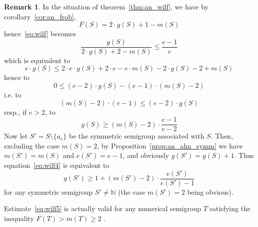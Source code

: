 \documentclass[a4paper,12pt,scrbook]{amsart}
\def \N{\mathbb N}
\theoremstyle{plain}%
\theoremstyle{definition}
\newtheorem{rem}[satz]{Remark}
\begin{document}
\begin{rem}
In the situation of theorem~\ref{thm:an_wilf}, we have 
by corollary~\ref{cor:an_frob}, 
	$$ F(S) = 2\cdot g(S)+1-m(S) $$ 
hence~\eqref{eq:wilf} becomes 
 	\begin{equation}\label{eq:wilf2} 
	\frac {g(S)}{2 \cdot g(S)+2-m(S)} \leq \frac {e-1}{e} 
	\end{equation}
which is equivalent to 
 	\begin{equation}\label{eq:wilf2.1} 
	e \cdot g(S) \leq 2 \cdot e \cdot g(S) + 2 \cdot e - e \cdot m(S) - 
	2 \cdot g(S) - 2 + m(S)
	\end{equation}
hence to
    	\begin{equation}\label{eq:wilf2.2} 
	0 \leq (e-2) \cdot g(S) - (e-1) \cdot (m(S) - 2)
	\end{equation}
i.e. to
 	\begin{equation}\label{eq:wilf3} 
	(m(S)-2) \cdot (e-1) \leq  (e-2) \cdot g(S)
	\end{equation}
resp., if $e > 2$, to 
 	\begin{equation}\label{eq:wilf4} 
	g(S) \geq  (m(S)-2) \cdot \frac {e-1}{e-2} 
	\end{equation}
Now let $S' = S \setminus \{a_e\}$ be the symmetric semigroup associated with $S$. 
Then, excluding the case $m(S) = 2$, by Proposition~\ref{prop:an_alm_symm} 
we have $m(S') = m(S)$ and $e(S') = e-1$, 
and obviously $g(S') = g(S) +1$. Thus equation~\eqref{eq:wilf4} is equivalent to 
 	\begin{equation}\label{eq:wilf5} 
	g(S') \geq  1 +  (m(S')-2) \cdot \frac {e(S')}{e(S')-1} 
	\end{equation} 
for any symmetric semigroup $S' \neq \N$ (the case $m(S') = 2$ being obvious). 

Estimate~\eqref{eq:wilf5} is actually valid for any numerical semigroup $T$ 
satisfying the inequality $F(T) > m(T) \geq 2$ . 


\end{rem}
\end{document}
